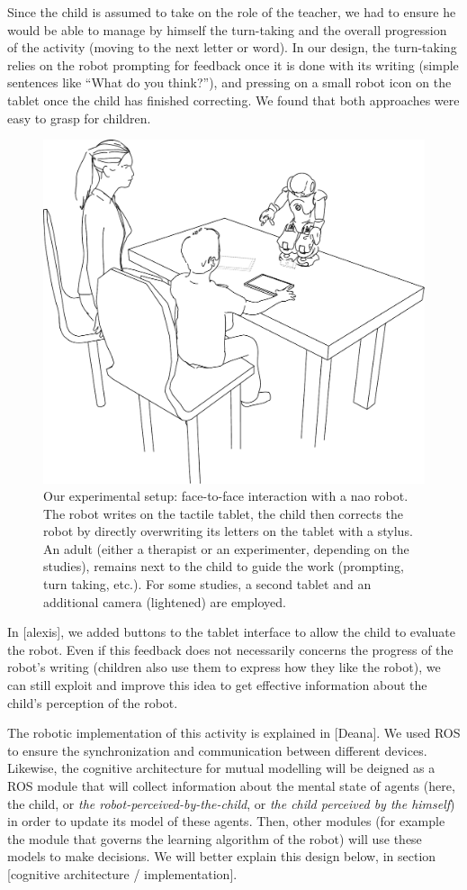 \documentclass[10pt,a4paper,twocolumn]{article}
\begin{document}
Since the child is assumed to take on the role of the teacher, we had to ensure
he would be able to manage by himself the turn-taking and the overall
progression of the activity (moving to the next letter or word). In our design,
the turn-taking relies on the robot prompting for feedback once it is done with
its writing (simple sentences like ``What do you think?''), and pressing on a
small robot icon on the tablet once the child has finished correcting. We found that both approaches were easy to grasp for children.


   \begin{figure}
       \centering
       \includegraphics[width=0.6\columnwidth]{experimental_setup}
       \caption{\small Our experimental setup: face-to-face interaction with a {\sc
           nao} robot.  The robot writes on the tactile tablet, the child then
           corrects the robot by directly overwriting its letters on the tablet
           with a stylus. An adult (either a therapist or an experimenter,
           depending on the studies), remains next to the child to guide the work
           (prompting, turn taking, etc.). For some studies, a second tablet and an
           additional camera (lightened) are employed.}

       \label{experimental_setup}
   \end{figure}
   
In [alexis], we added buttons to the tablet interface to allow the child to evaluate the robot. Even if this feedback does not necessarily concerns the progress of the robot's writing (children also use them to express how they like the robot), we can still exploit and improve this idea to get effective information about the child's perception of the robot.
   
The robotic implementation of this activity is explained in [Deana]. We used ROS to ensure the synchronization and communication between different devices. Likewise, the cognitive architecture for mutual modelling will be deigned as a ROS module that will collect information about the mental state of agents (here, the child, or \textit{the robot-perceived-by-the-child}, or \textit{the child perceived by the himself}) in order to update its model of these agents. Then, other modules (for example the module that governs the learning algorithm of the robot) will use these models to make decisions. We will better explain this design below, in section [cognitive architecture / implementation].
\end{document}
